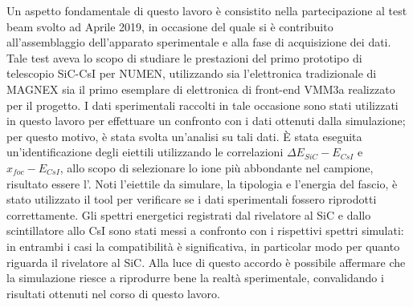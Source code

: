 Un aspetto fondamentale di questo lavoro è consistito nella partecipazione al test beam svolto ad Aprile 2019, in occasione del quale si è contribuito all'assemblaggio dell'apparato sperimentale e alla fase di acquisizione dei dati.
Tale test aveva lo scopo di studiare le prestazioni del primo prototipo di telescopio SiC-CsI per NUMEN, utilizzando sia l'elettronica tradizionale di MAGNEX sia il primo esemplare di elettronica di front-end VMM3a realizzato per il progetto.
I dati sperimentali raccolti in tale occasione sono stati utilizzati in questo lavoro per effettuare un confronto con i dati ottenuti dalla simulazione; per questo motivo, è stata svolta un'analisi su tali dati.
È stata eseguita un'identificazione degli eiettili utilizzando le correlazioni $\Delta E_{SiC} -E_{CsI}$ e $x_{foc} -E_{CsI}$, allo scopo di selezionare lo ione più abbondante nel campione, risultato essere l'.
Noti l'eiettile da simulare, la tipologia e l'energia del fascio, è stato utilizzato il tool per verificare se i dati sperimentali fossero riprodotti correttamente.
Gli spettri energetici registrati dal rivelatore al SiC e dallo scintillatore allo CsI sono stati messi a confronto con i rispettivi spettri simulati: in entrambi i casi la compatibilità è significativa, in particolar modo per quanto riguarda il rivelatore al SiC.
Alla luce di questo accordo è possibile affermare che la simulazione riesce a riprodurre bene la realtà sperimentale, convalidando i risultati ottenuti nel corso di questo lavoro.






